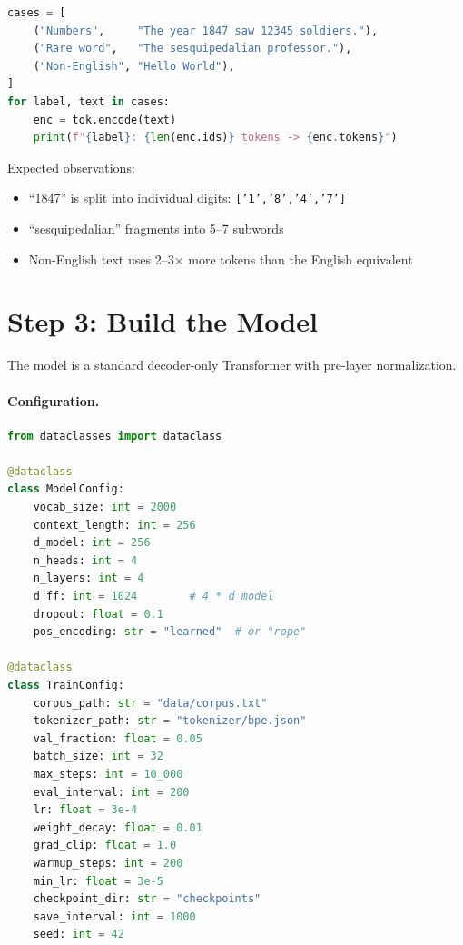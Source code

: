 \begin{lstlisting}[language=python, caption={Tokenizer edge cases}]
cases = [
    ("Numbers",     "The year 1847 saw 12345 soldiers."),
    ("Rare word",   "The sesquipedalian professor."),
    ("Non-English", "Hello World"),
]
for label, text in cases:
    enc = tok.encode(text)
    print(f"{label}: {len(enc.ids)} tokens -> {enc.tokens}")
\end{lstlisting}

Expected observations:
\begin{itemize}[nosep]
  \item ``1847'' is split into individual digits: \texttt{['1','8','4','7']}
  \item ``sesquipedalian'' fragments into 5--7 subwords
  \item Non-English text uses 2--3$\times$ more tokens than the English equivalent
\end{itemize}


\section{Step 3: Build the Model}
\label{sec:guide-model}

The model is a standard decoder-only Transformer with pre-layer normalization.

\paragraph{Configuration.}

\begin{lstlisting}[language=python, caption={config.py --- model hyperparameters}]
from dataclasses import dataclass

@dataclass
class ModelConfig:
    vocab_size: int = 2000
    context_length: int = 256
    d_model: int = 256
    n_heads: int = 4
    n_layers: int = 4
    d_ff: int = 1024        # 4 * d_model
    dropout: float = 0.1
    pos_encoding: str = "learned"  # or "rope"

@dataclass
class TrainConfig:
    corpus_path: str = "data/corpus.txt"
    tokenizer_path: str = "tokenizer/bpe.json"
    val_fraction: float = 0.05
    batch_size: int = 32
    max_steps: int = 10_000
    eval_interval: int = 200
    lr: float = 3e-4
    weight_decay: float = 0.01
    grad_clip: float = 1.0
    warmup_steps: int = 200
    min_lr: float = 3e-5
    checkpoint_dir: str = "checkpoints"
    save_interval: int = 1000
    seed: int = 42
\end{lstlisting}


